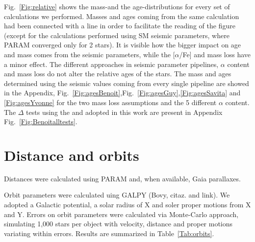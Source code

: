 \documentclass{aa}
\begin{document}
Fig.~\ref{Fig:relative} shows the mass-\FeH and the age-\FeH distributions for every set of calculations we performed. Masses and ages coming from the same calculation had been connected with a line in order to facilitate the reading of the figure (except for the calculations performed using SM seismic parameters, where PARAM converged only for 2 stars). It is visible how the bigger impact on age and mass comes from the seismic parameters, while the [$\alpha$/Fe] and mass loss have a minor effect. The different approaches in seismic parameter pipelines, $\alpha$ content and mass loss do not alter the relative ages of the stars. The mass and ages determined using the seismic values coming from every single pipeline are showed in the Appendix, Fig.~\ref{Fig:agesBenoit},Fig.~\ref{Fig:agesGuy},\ref{Fig:agesSavita} and \ref{Fig:agesYvonne} for the two mass loss assumptions and the 5 different $\alpha$ content. The $\Delta$ \Teff tests using the \dnu and \numax adopted in this work are present in Appendix Fig.~\ref{Fig:Benoitalltests}. 

\section{Distance and orbits} 
Distances were calculated using PARAM and, when available, Gaia parallaxes.

Orbit parameters were calculated uing GALPY (Bovy, citaz. and link). We adopted a Galactic potential, a solar radius of X and soler proper motions from X and Y. Errors on orbit parameters were calculated via Monte-Carlo approach, simulating 1,000 stars per object  with velocity, distance and proper motions variating within errors. Results are summarized in Table~\ref{Tab:orbits}.
\end{document}
